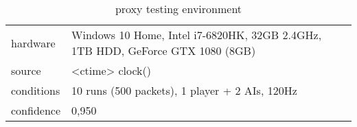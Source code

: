 \begin{table}[!ht]
	\centering
    \begin{tabular}{l|l}
        hardware & Windows 10 Home, Intel i7-6820HK, 32GB 2.4GHz, 1TB HDD, GeForce GTX 1080 (8GB) \\
		source & <ctime> clock() \\
		conditions & 10 runs (500 packets), 1 player + 2 AIs, 120Hz \\
		confidence & 0,950 \\
    \end{tabular}

    \caption{proxy testing environment}\label{tb:performance:proxy}
\end{table}
